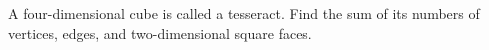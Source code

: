 A four-dimensional cube is called a tesseract. Find the sum of its numbers of vertices, edges, and two-dimensional square faces.
